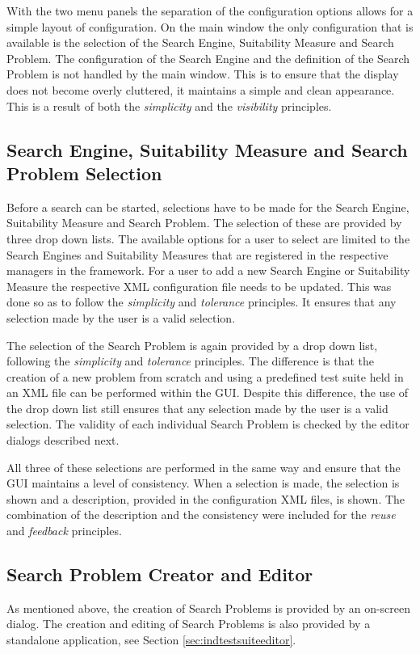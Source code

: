 With the two menu panels the separation of the configuration options allows for a simple layout of configuration.
On the main window the only configuration that is available is the selection of the Search Engine, Suitability Measure and Search Problem.
The configuration of the Search Engine and the definition of the Search Problem is not handled by the main window.
This is to ensure that the display does not become overly cluttered, it maintains a simple and clean appearance.
This is a result of both the \emph{simplicity} and the \emph{visibility} principles.

\subsection{Search Engine, Suitability Measure and Search Problem Selection}

Before a search can be started, selections have to be made for the Search Engine, Suitability Measure and Search Problem.
The selection of these are provided by three drop down lists.
The available options for a user to select are limited to the Search Engines and Suitability Measures that are registered in the respective managers in the framework.
For a user to add a new Search Engine or Suitability Measure the respective XML configuration file needs to be updated.
This was done so as to follow the \emph{simplicity} and \emph{tolerance} principles.
It ensures that any selection made by the user is a valid selection.

The selection of the Search Problem is again provided by a drop down list, following the \emph{simplicity} and \emph{tolerance} principles.
The difference is that the creation of a new problem from scratch and using a predefined test suite held in an XML file can be performed within the GUI.
Despite this difference, the use of the drop down list still ensures that any selection made by the user is a valid selection.
The validity of each individual Search Problem is checked by the editor dialogs described next.

All three of these selections are performed in the same way and ensure that the GUI maintains a level of consistency.
When a selection is made, the selection is shown and a description, provided in the configuration XML files, is shown.
The combination of the description and the consistency were included for the \emph{reuse} and \emph{feedback} principles.

\subsection{Search Problem Creator and Editor}
As mentioned above, the creation of Search Problems is provided by an on-screen dialog.
The creation and editing of Search Problems is also provided by a standalone application, see Section \ref{sec:indtestsuiteeditor}.

